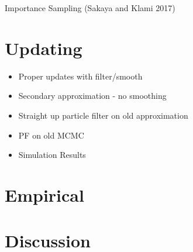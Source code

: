 \documentclass[12pt,a4paper]{article}%
\numberwithin{equation}{section}
\begin{document}
Importance Sampling (Sakaya and Klami 2017)


\section{Updating}

\begin{itemize}
\item Proper updates with filter/smooth
\item Secondary approximation - no smoothing
\item Straight up particle filter on old approximation
\item PF on old MCMC
\item Simulation Results
\end{itemize}

\section{Empirical}

\section{Discussion}



 
\end{document}
